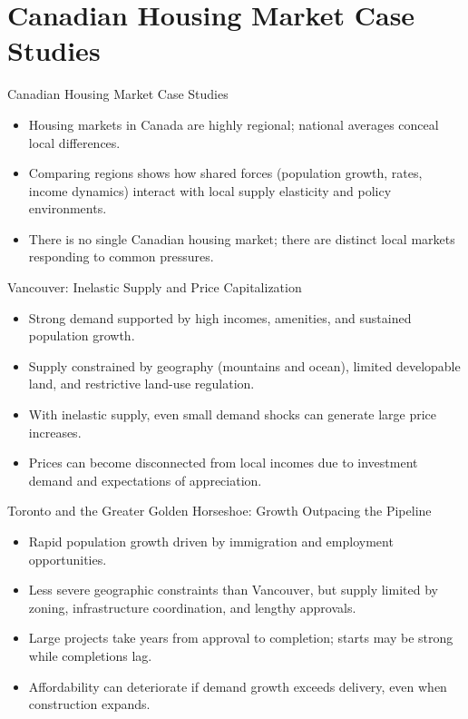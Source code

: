 \documentclass[aspectratio=169]{beamer}
\begin{document}
\section{Canadian Housing Market Case Studies}

\begin{frame}{Canadian Housing Market Case Studies}
\transfade
\begin{itemize}[<+->]
  \item Housing markets in Canada are highly regional; national averages conceal local differences.
  \item Comparing regions shows how shared forces (population growth, rates, income dynamics) interact with local supply elasticity and policy environments.
  \item There is no single Canadian housing market; there are distinct local markets responding to common pressures.
\end{itemize}
\end{frame}

\begin{frame}{Vancouver: Inelastic Supply and Price Capitalization}
\transfade
\begin{itemize}[<+->]
  \item Strong demand supported by high incomes, amenities, and sustained population growth.
  \item Supply constrained by geography (mountains and ocean), limited developable land, and restrictive land-use regulation.
  \item With inelastic supply, even small demand shocks can generate large price increases.
  \item Prices can become disconnected from local incomes due to investment demand and expectations of appreciation.
\end{itemize}
\end{frame}

\begin{frame}{Toronto and the Greater Golden Horseshoe: Growth Outpacing the Pipeline}
\transfade
\begin{itemize}[<+->]
  \item Rapid population growth driven by immigration and employment opportunities.
  \item Less severe geographic constraints than Vancouver, but supply limited by zoning, infrastructure coordination, and lengthy approvals.
  \item Large projects take years from approval to completion; starts may be strong while completions lag.
  \item Affordability can deteriorate if demand growth exceeds delivery, even when construction expands.
\end{itemize}
\end{frame}
\end{document}
